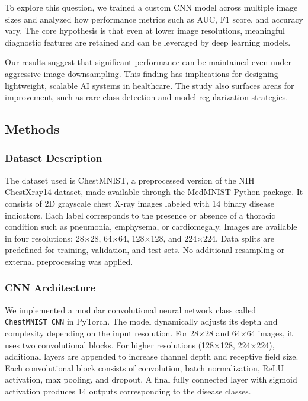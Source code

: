 \documentclass[
]{article}
\begin{document}
To explore this question, we trained a custom CNN model across multiple
image sizes and analyzed how performance metrics such as AUC, F1 score,
and accuracy vary. The core hypothesis is that even at lower image
resolutions, meaningful diagnostic features are retained and can be
leveraged by deep learning models.

Our results suggest that significant performance can be maintained even
under aggressive image downsampling. This finding has implications for
designing lightweight, scalable AI systems in healthcare. The study also
surfaces areas for improvement, such as rare class detection and model
regularization strategies.

\subsection{Methods}\label{methods}

\subsubsection{Dataset Description}\label{dataset-description}

The dataset used is ChestMNIST, a preprocessed version of the NIH
ChestXray14 dataset, made available through the MedMNIST Python package.
It consists of 2D grayscale chest X-ray images labeled with 14 binary
disease indicators. Each label corresponds to the presence or absence of
a thoracic condition such as pneumonia, emphysema, or cardiomegaly.
Images are available in four resolutions: 28×28, 64×64, 128×128, and
224×224. Data splits are predefined for training, validation, and test
sets. No additional resampling or external preprocessing was applied.

\subsubsection{CNN Architecture}\label{cnn-architecture}

We implemented a modular convolutional neural network class called
\texttt{ChestMNIST\_CNN} in PyTorch. The model dynamically adjusts its
depth and complexity depending on the input resolution. For 28×28 and
64×64 images, it uses two convolutional blocks. For higher resolutions
(128×128, 224×224), additional layers are appended to increase channel
depth and receptive field size. Each convolutional block consists of
convolution, batch normalization, ReLU activation, max pooling, and
dropout. A final fully connected layer with sigmoid activation produces
14 outputs corresponding to the disease classes.
\end{document}
